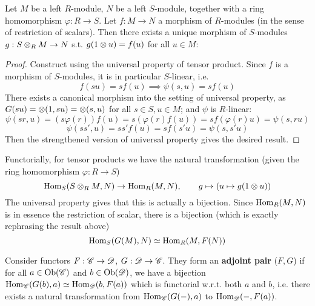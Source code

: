 \documentclass{article}
\begin{document}
\clearpage
\begin{theorem} 
    Let $M$ be a left $R$-module, $N$ be a left $S$-module, together with a ring homomorphism $\varphi: R \to S$. Let $f: M \to N$ a morphism of $R$-modules (in the sense of restriction of scalars). Then there exists a unique morphism of $S$-modules $g: S \otimes_R M \to N$ s.t. $g(1 \otimes u) = f(u)$ for all $u \in M$:
    
    \begin{figure}[htbp]
        \centering
    \end{figure}
\end{theorem}

\begin{proof}
    Construct using the universal property of tensor product. Since $f$ is a morphism of $S$-modules, it is in particular $S$-linear, i.e.
        \[
            f(su) = s f(u) \implies \psi(s, u) = s f(u)
        \]
    There exists a canonical morphism into the setting of universal property, as $G(su) = \otimes(1, su) = \otimes(s, u)$ for all $s \in S, u \in M$; and $\psi$ is $R$-linear:
    \[
        \psi(sr, u) = (s\varphi(r)) f(u) = s (\varphi(r) f(u)) = s f(\varphi(r) u) = \psi(s, ru)
    \]
    \[
        \psi(ss', u) = ss' f(u) = s f(s'u) = \psi(s, s'u)
    \]
    Then the strengthened version of universal property gives the desired result.
\end{proof}

\begin{remark}
    Functorially, for tensor products we have the natural transformation (given the ring homomorphism $\varphi: R \to S$)
    \[
        \mathrm{Hom}_S(S \otimes_R M, N) \to \mathrm{Hom}_R(M, N), \qquad g \mapsto (u \mapsto g(1 \otimes u))
    \]
    The universal property gives that this is actually a bijection. Since $\mathrm{Hom}_R(M, N)$ is in essence the restriction of scalar, there is a bijection (which is exactly rephrasing the result above)
    \[
        \mathrm{Hom}_{S}(G(M), N) \simeq \mathrm{Hom}_R(M, F(N))
    \]
\end{remark}

\begin{definition}
    Consider functors $F: \mathscr{C} \to \mathscr{D}$, $G: \mathscr{D} \to \mathscr{C}$. They form an \textbf{adjoint pair} ($F, G$) if for all $a \in \mathrm{Ob}(\mathscr{C})$ and $b \in \mathrm{Ob}(\mathscr{D})$, we have a bijection $\mathrm{Hom}_{\mathscr{C}}(G(b), a) \simeq \mathrm{Hom}_{\mathscr{D}}(b, F(a))$ which is functorial w.r.t. both $a$ and $b$, i.e. there exists a natural transformation from $\mathrm{Hom}_{\mathscr{C}}(G(-), a)$ to $\mathrm{Hom}_{\mathscr{D}}(-, F(a))$.
\end{definition}
\end{document}
